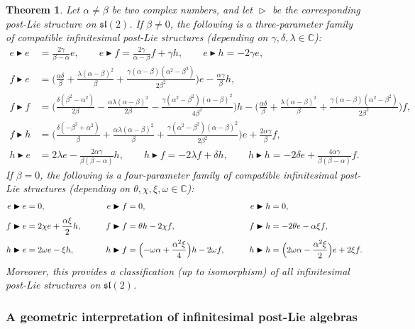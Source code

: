 \documentclass[10pt]{article}
\newtheorem {theorem} [lemma] {Theorem}
\theoremstyle{definition}
\newcommand{\wt}{\vartriangleright}
\newcommand{\bt}{\blacktriangleright}
\newcommand{\s}{\mathfrak{s}}
\renewcommand{\l}{\mathfrak{l}}
\begin{document}
\begin{theorem}
Let $\alpha \neq \beta$ be two complex numbers, and let $\wt$ be the corresponding post-Lie structure on $\s\l(2)$. If $\beta \neq0$, the following is a three-parameter family of compatible infinitesimal post-Lie structures (depending on $\gamma,\delta,\lambda \in \mathbb{C}$):
\[
\begin{aligned}
e \bt e &= \frac{2\gamma}{\beta-\alpha}e, \quad\quad e \bt f = \frac{2\gamma}{\alpha-\beta}f + \gamma h, \quad\quad e \bt h = -2\gamma e, \\
f \bt e &= \Big(\frac{\alpha\delta}{\beta}+\frac{\lambda(\alpha-\beta)^2}{\beta}+\frac{\gamma(\alpha-\beta)(\alpha^2-\beta^2)}{2\beta^2}\Big)e - \frac{\alpha\gamma}{\beta}h, \\
f \bt f &= \Big(\frac{\delta(\beta^2-\alpha^2)}{2\beta}-\frac{\alpha\lambda(\alpha-\beta)^2}{2\beta}-\frac{\gamma(\alpha^2-\beta^2)(\alpha-\beta)^2}{4\beta^2}\Big)h - \Big(\frac{\alpha\delta}{\beta}+\frac{\lambda(\alpha-\beta)^2}{\beta}+\frac{\gamma(\alpha-\beta)(\alpha^2-\beta^2)}{2\beta^2}\Big)f, \\
f \bt h &= \Big(\frac{\delta(-\beta^2+\alpha^2)}{\beta}+\frac{\alpha\lambda(\alpha-\beta)^2}{\beta}+\frac{\gamma(\alpha^2-\beta^2)(\alpha-\beta)^2}{2\beta^2}\Big)e + \frac{2\alpha\gamma}{\beta}f, \\
h \bt e &= 2\lambda e - \frac{2\alpha\gamma}{\beta(\beta-\alpha)}h, \quad\quad h \bt f = -2\lambda f + \delta h, \quad\quad h \bt h = -2\delta e + \frac{4\alpha\gamma}{\beta(\beta-\alpha)}f.
\end{aligned}
\]
If $\beta=0$, the following is a four-parameter family of compatible infinitesimal post-Lie structures (depending on $\theta,\chi,\xi,\omega \in \mathbb{C}$):
\[
\begin{aligned}
e \bt e &= 0, \qquad  &
e \bt f &= 0, \qquad &
e \bt h &= 0,\\[0.5ex]
f \bt e &= 2\chi e + \frac{\alpha\xi}{2}h, \qquad &
f \bt f &= \theta h - 2\chi f, \qquad &
f \bt h &= -2\theta e - \alpha\xi f,\\[0.5ex]
h \bt e &= 2\omega e - \xi h, \qquad &
h \bt f &= \Bigl(-\omega\alpha+\frac{\alpha^2\xi}{4}\Bigr)h - 2\omega f,\qquad &
h \bt h &= \Bigl(2\omega\alpha-\frac{\alpha^2\xi}{2}\Bigr)e + 2\xi f.
\end{aligned}
\]
Moreover, this provides a classification (up to isomorphism) of all infinitesimal post-Lie structures on $\s\l(2)$.
\end{theorem}

\subsubsection{A geometric interpretation of infinitesimal post-Lie algebras}\label{sec:geometry}
\end{document}
